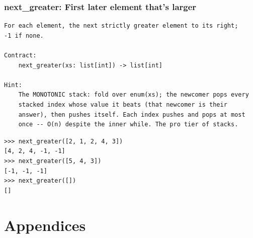 \documentclass[10pt,letterpaper]{book}
\begin{document}
\section{next\_greater: First later element that's larger}
\begin{lstlisting}[style=ex]
For each element, the next strictly greater element to its right;
-1 if none.

Contract:
    next_greater(xs: list[int]) -> list[int]

Hint:
    The MONOTONIC stack: fold over enum(xs); the newcomer pops every
    stacked index whose value it beats (that newcomer is their
    answer), then pushes itself. Each index pushes and pops at most
    once -- O(n) despite the inner while. The pro tier of stacks.
\end{lstlisting}
\begin{lstlisting}[style=ex]
>>> next_greater([2, 1, 2, 4, 3])
[4, 2, 4, -1, -1]
>>> next_greater([5, 4, 3])
[-1, -1, -1]
>>> next_greater([])
[]
\end{lstlisting}
\appendix
\part{Appendices}
\end{document}
